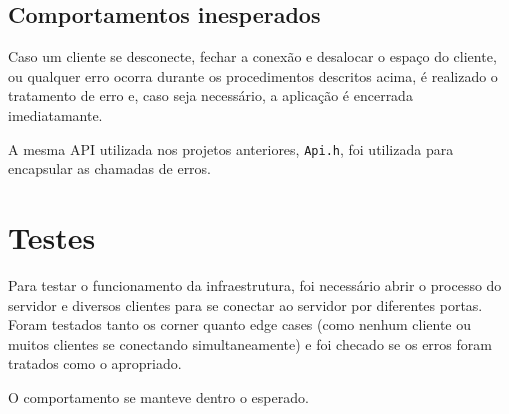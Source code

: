 \documentclass[10pt,twocolumn,letterpaper]{article}
\begin{document}
\subsection{Comportamentos inesperados}

Caso um cliente se desconecte, fechar a conexão e desalocar o espaço do cliente, ou qualquer erro ocorra durante os procedimentos descritos acima, é realizado o tratamento de erro e, caso seja necessário, a aplicação é encerrada imediatamante.

A mesma API utilizada nos projetos anteriores, \texttt{Api.h}, foi utilizada para encapsular as chamadas de erros.

\section{Testes}

Para testar o funcionamento da infraestrutura, foi necessário abrir o processo do servidor e diversos clientes para se conectar ao servidor por diferentes portas. Foram testados tanto os corner quanto edge cases (como nenhum cliente ou muitos clientes se conectando simultaneamente) e foi checado se os erros foram tratados como o apropriado.

O comportamento se manteve dentro o esperado.

{\small


}
\end{document}
